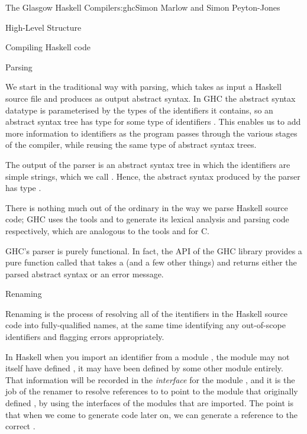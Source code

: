 \begin{aosachapter}{The Glasgow Haskell Compiler}{s:ghc}{Simon Marlow and Simon Peyton-Jones}
\begin{aosasect1}{High-Level Structure}
\begin{aosasect2}{Compiling Haskell code}

\begin{aosasect3}{Parsing}

We start in the traditional way with parsing, which takes as input a
Haskell source file and produces as output abstract syntax.  In GHC
the abstract syntax datatype  is parameterised by the
types of the identifiers it contains, so an abstract syntax tree has
type  for some type of identifiers .  This
enables us to add more information to identifiers as the program
passes through the various stages of the compiler, while reusing the
same type of abstract syntax trees.

The output of the parser is an abstract syntax tree in which the
identifiers are simple strings, which we call .  Hence,
the abstract syntax produced by the parser has type .

There is nothing much out of the ordinary in the way we parse Haskell
source code; GHC uses the tools  and  to
generate its lexical analysis and parsing code respectively, which are
analogous to the tools  and  for C.

GHC's parser is purely functional.  In fact, the API of the GHC
library provides a pure function called  that takes a
 (and a few other things) and returns either the parsed
abstract syntax or an error message.

\end{aosasect3}

\begin{aosasect3}{Renaming}

Renaming is the process of resolving all of the itentifiers in the
Haskell source code into fully-qualified names, at the same time
identifying any out-of-scope identifiers and flagging errors
appropriately.

In Haskell when you import an identifier  from a module
, the module  may not itself have defined , it
may have been defined by some other module entirely.  That information
will be recorded in the \emph{interface} for the module , and
it is the job of the renamer to resolve references to  to
point to the module that originally defined , by using the
interfaces of the modules that are imported.  The point is that when
we come to generate code later on, we can generate a reference to the
correct .


\end{aosasect3}
\end{aosasect2}
\end{aosasect1}
\end{aosachapter}
